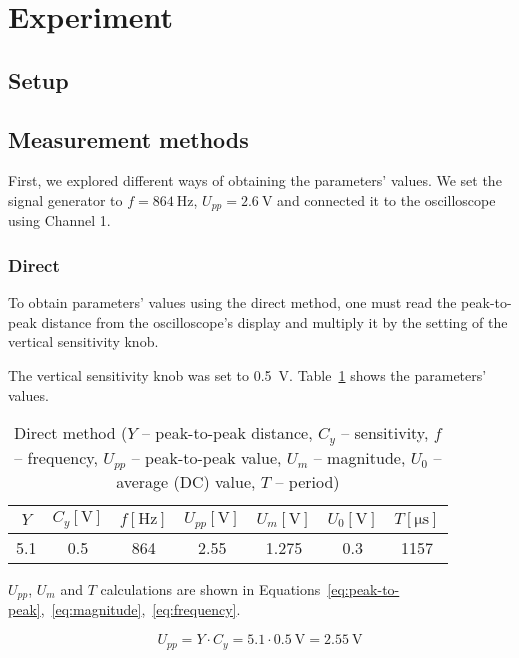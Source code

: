 \section{Experiment}
\subsection{Setup}

\subsection{Measurement methods}

First, we explored different ways of obtaining the parameters' values. We set the signal generator to $f = \SI{864}{\hertz}$, $U_{pp} = \SI{2.6}{\volt}$ and connected it to the oscilloscope using Channel 1.

\subsubsection*{Direct}

 To obtain parameters' values using the direct method, one must read the peak-to-peak distance from the oscilloscope's display and multiply it by the setting of the vertical sensitivity knob.

The vertical sensitivity knob was set to \SI{0.5}{\volt}. Table~\ref{tab:direct-method} shows the parameters' values.

\begin{table}[H]
	\centering
	\begin{tabular}{c|c|c|c|c|c|c}
		$Y$ & $C_{y} [\unit{\volt}]$ & $f [\unit{\hertz}]$ & $U_{pp} [\unit{\volt}]$ & $U_{m} [\unit{\volt}]$ & $U_{0} [\unit{\volt}]$ & $T [\unit{\micro\second}]$\\
		\hline
		5.1 & 0.5 & 864 & 2.55 & 1.275 & 0.3 & 1157
	\end{tabular}
	\caption{Direct method ($Y$ -- peak-to-peak distance, $C_{y}$ -- sensitivity, $f$ -- frequency, $U_{pp}$ -- peak-to-peak value, $U_{m}$ -- magnitude, $U_{0}$ -- average (DC) value, $T$ -- period)}
	\label{tab:direct-method}
\end{table}

$U_{pp}$, $U_{m}$ and $T$ calculations are shown in Equations~\ref{eq:peak-to-peak},~\ref{eq:magnitude},~\ref{eq:frequency}.


\begin{equation}
	U_{pp} = Y\cdot C_{y} = 5.1\cdot \SI{0.5}{\volt} = \SI{2.55}{\volt}
	\label{eq:peak-to-peak}
\end{equation}

